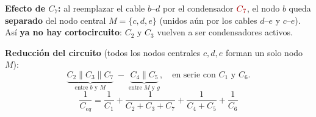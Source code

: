 \documentclass[12pt,letterpaper]{article}
\begin{document}
\begin{center}
\end{center}

\vspace{0.5cm}

\noindent\textbf{Efecto de $C_7$:} al reemplazar el cable $b$--$d$ por el condensador
$\textcolor{newcol}{C_7}$, el nodo $b$ queda \textbf{separado} del nodo central
$M=\{c,d,e\}$ (unidos a\'un por los cables $d$--$e$ y $c$--$e$). As\'i \textbf{ya no hay
cortocircuito}: $C_2$ y $C_3$ vuelven a ser condensadores activos.

\medskip

\noindent\textbf{Reducci\'on del circuito} (todos los nodos centrales $c,d,e$ forman un solo
nodo $M$):
\[
    \underbrace{C_2 \parallel C_3 \parallel C_7}_{\text{entre } b \text{ y } M}
    \;-\;
    \underbrace{C_4 \parallel C_5}_{\text{entre } M \text{ y } g},
    \quad\text{en serie con } C_1 \text{ y } C_6.
\]
\[
    \frac{1}{C_{eq}} = \frac{1}{C_1}
    + \frac{1}{C_2 + C_3 + C_7}
    + \frac{1}{C_4 + C_5}
    + \frac{1}{C_6}
\]
\end{document}
